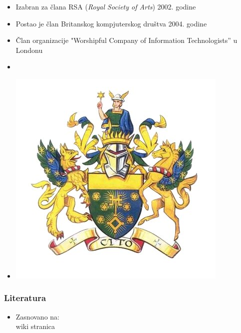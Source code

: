 \documentclass{beamer}
\begin{document}
\begin{frame}

\begin{itemize}

		\item Izabran za člana RSA (\textit{Royal Society of Arts}) 2002. godine

		\item Postao je član Britanskog kompjuterskog društva 2004. godine

		\item Član organizacije "Worshipful Company of Information Technologists” u Londonu

		\item[]

		\item[] \begin{center} \includegraphics[scale=0.25]{7Nb1Hw2A_400x400.jpg} \end{center}

	

		    \end{itemize}

\end{frame}

\begin{frame}[fragile]\frametitle{Literatura}

	\begin{itemize}

		\item Zasnovano na:\\

		wiki stranica

	\end{itemize}

\end{frame}
\end{document}

